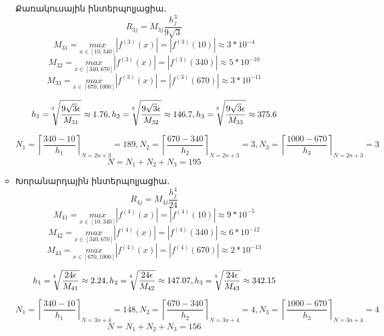\documentclass{article}
\begin{document}
\begin{enumerate}
\begin{itemize}
Քառակուսային ինտերպոլյացիա․
				$$R_{3j} = M_{3j} \dfrac{h_{j}^{3}}{9 \sqrt{3}}$$
				$$M_{31} = \underset{x \in \left[10, 340\right]}{max}\left|f^{\left(3\right)}\left(x\right)\right| = \left|f^{\left(3\right)}\left(10\right)\right| \approx 3 * 10^{-4}$$
				$$M_{32} = \underset{x \in \left[340, 670\right]}{max}\left|f^{\left(3\right)}\left(x\right)\right| = \left|f^{\left(3\right)}\left(340\right)\right| \approx 5 * 10^{-10}$$
				$$M_{33} = \underset{x \in \left[670, 1000\right]}{max}\left|f^{\left(3\right)}\left(x\right)\right| = \left|f^{\left(3\right)}\left(670\right)\right| \approx 3 * 10^{-11}$$


				$$ h_{1} = \sqrt[\leftroot{5} \uproot{5} 3]{\dfrac{9 \sqrt{3} \epsilon}{M_{31}}}  \approx 1.76, 
					h_{2} = \sqrt[\leftroot{5} \uproot{5} 3]{\dfrac{9 \sqrt{3} \epsilon}{M_{32}}} \approx 146.7, 
					h_{3} = \sqrt[\leftroot{5} \uproot{5} 3]{\dfrac{9 \sqrt{3} \epsilon}{M_{33}}} \approx 375.6$$


				$$N_{1} = \left \lceil{\dfrac{340 - 10}{h_{1}}} \right \rceil_{N = 2n + 3} = 189, N_{2} = \left \lceil{\dfrac{670 - 340}{h_{2}}} \right \rceil_{N = 2n + 3} = 3, N_{3} = \left \lceil{\dfrac{1000 - 670}{h_{3}}} \right \rceil_{N = 2n + 3} = 3$$
				$$ N = N_{1} + N_{2} + N_{3} = 195$$

\item


Խորանարդային ինտերպոլյացիա․
				$$R_{4j} = M_{4j} \dfrac{h_{j}^{4}}{24}$$
				$$M_{41} = \underset{x \in \left[10, 340\right]}{max}\left|f^{\left(4\right)}\left(x\right)\right| = \left|f^{\left(4\right)}\left(10\right)\right| \approx 9 * 10^{-5}$$
				$$M_{42} = \underset{x \in \left[340, 670\right]}{max}\left|f^{\left(4\right)}\left(x\right)\right| = \left|f^{\left(4\right)}\left(340\right)\right| \approx 6 * 10^{-12}$$
				$$M_{43} = \underset{x \in \left[670, 1000\right]}{max}\left|f^{\left(4\right)}\left(x\right)\right| = \left|f^{\left(4\right)}\left(670\right)\right| \approx 2 * 10^{-13}$$


				$$h_{1} = \sqrt[\leftroot{5} \uproot{5} 4]{\dfrac{24 \epsilon}{M_{41}}} \approx 2.24, 
					h_{2} = \sqrt[\leftroot{5} \uproot{5} 4]{\dfrac{24 \epsilon}{M_{42}}} \approx 147.07, 
					h_{3} = \sqrt[\leftroot{5} \uproot{5} 4]{\dfrac{24 \epsilon}{M_{43}}} \approx 342.15$$


				$$N_{1} = \left \lceil{\dfrac{340 - 10}{h_{1}}} \right \rceil_{N = 3n+4} = 148, N_{2} = \left \lceil{\dfrac{670 - 340}{h_{2}}} \right \rceil_{N = 3n+4} = 4, N_{3} = \left \lceil{\dfrac{1000 - 670}{h_{3}}} \right \rceil_{N = 3n+4} = 4$$
				$$ N = N_{1} + N_{2} + N_{3} = 156$$



\end{itemize}

\newpage


\end{enumerate}
\end{document}
